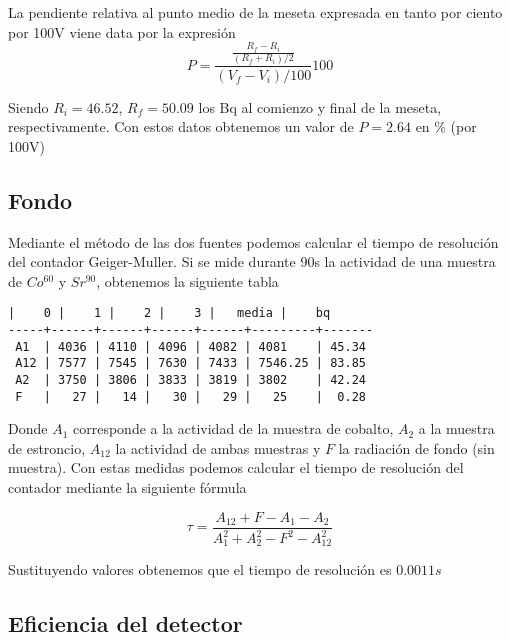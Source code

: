 \documentclass[11pt]{article}
\begin{document}
    

    La pendiente relativa al punto medio de la meseta expresada en tanto por
ciento por 100V viene data por la expresión \[
P = \frac{\frac{R_f - R_i}{(R_f + R_i)/2}}{(V_f - V_i)/100}100
\]
 
            
    
    Siendo \(R_i = 46.52\), \(R_f=50.09\) los Bq al comienzo y final de la
meseta, respectivamente. Con estos datos obtenemos un valor de
\(P=2.64\) en \% (por 100V)

    

    \hypertarget{fondo}{%
\subsection{Fondo}\label{fondo}}

    Mediante el método de las dos fuentes podemos calcular el tiempo de
resolución del contador Geiger-Muller. Si se mide durante 90s la
actividad de una muestra de \(Co^{60}\) y \(Sr^{90}\), obtenemos la
siguiente tabla

    \begin{Verbatim}[commandchars=\\\{\}]
     |    0 |    1 |    2 |    3 |   media |    bq
-----+------+------+------+------+---------+-------
 A1  | 4036 | 4110 | 4096 | 4082 | 4081    | 45.34
 A12 | 7577 | 7545 | 7630 | 7433 | 7546.25 | 83.85
 A2  | 3750 | 3806 | 3833 | 3819 | 3802    | 42.24
 F   |   27 |   14 |   30 |   29 |   25    |  0.28
    \end{Verbatim}

    Donde \(A_1\) corresponde a la actividad de la muestra de cobalto,
\(A_2\) a la muestra de estroncio, \(A_{12}\) la actividad de ambas
muestras y \(F\) la radiación de fondo (sin muestra). Con estas medidas
podemos calcular el tiempo de resolución del contador mediante la
siguiente fórmula

\[
\tau = \frac{A_{12} + F - A_1 - A_2}{A_1^2 + A_2^2 - F^2 - A_{12}^2}
\]
 
            
    
    Sustituyendo valores obtenemos que el tiempo de resolución es
\(0.0011s\)

    

    \hypertarget{eficiencia-del-detector}{%
\subsection{Eficiencia del detector}\label{eficiencia-del-detector}}
\end{document}
